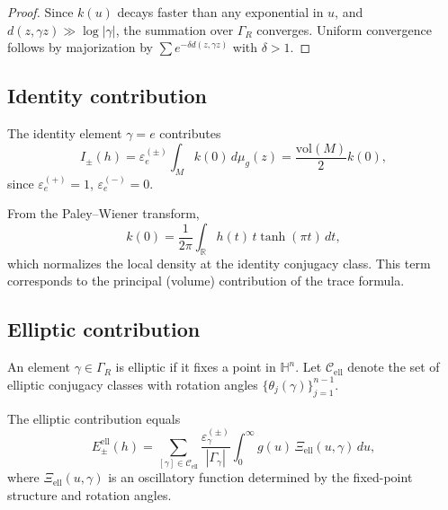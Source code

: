 \begin{proof}
Since $k(u)$ decays faster than any exponential in $u$, and $d(z,\gamma z)\gg \log|\gamma|$, the summation over $\Gamma_R$ converges.  
Uniform convergence follows by majorization by $\sum e^{-\delta d(z,\gamma z)}$ with $\delta>1$. %
\end{proof}

\subsection{Identity contribution}
\label{subsec:ch6-part5-identity} \relax

\begin{definition}
\label{def:identity-term}
The identity element $\gamma=e$ contributes
\[
I_\pm(h)
=\varepsilon_e^{(\pm)}\int_M k(0)\,d\mu_g(z)
=\frac{\mathrm{vol}(M)}{2}k(0),
\]
since $\varepsilon_e^{(+)}=1$, $\varepsilon_e^{(-)}=0$. %
\end{definition}

\begin{remark}[Normalization of $k(0)$]
\label{rem:k0-normalization}
From the Paley–Wiener transform,
\[
k(0)=\frac{1}{2\pi}\int_{\mathbb{R}}h(t)\,t\tanh(\pi t)\,dt,
\]
which normalizes the local density at the identity conjugacy class.  
This term corresponds to the principal (volume) contribution of the trace formula. %
\end{remark}

\subsection{Elliptic contribution}
\label{subsec:ch6-part5-elliptic} \relax

\begin{definition}
\label{def:elliptic-class}
An element $\gamma\in\Gamma_R$ is elliptic if it fixes a point in $\mathbb{H}^n$.  
Let $\mathcal{C}_{\mathrm{ell}}$ denote the set of elliptic conjugacy classes with rotation angles $\{\theta_j(\gamma)\}_{j=1}^{n-1}$. %
\end{definition}

\begin{lemma}
\label{lem:elliptic-term}
The elliptic contribution equals
\[
E_\pm^{\mathrm{ell}}(h)
=\sum_{[\gamma]\in\mathcal{C}_{\mathrm{ell}}}
\frac{\varepsilon_\gamma^{(\pm)}}{|\Gamma_\gamma|}
\int_0^\infty g(u)\,\Xi_{\mathrm{ell}}(u,\gamma)\,du,
\]
where $\Xi_{\mathrm{ell}}(u,\gamma)$ is an oscillatory function determined by the fixed-point structure and rotation angles. %
\end{lemma}

